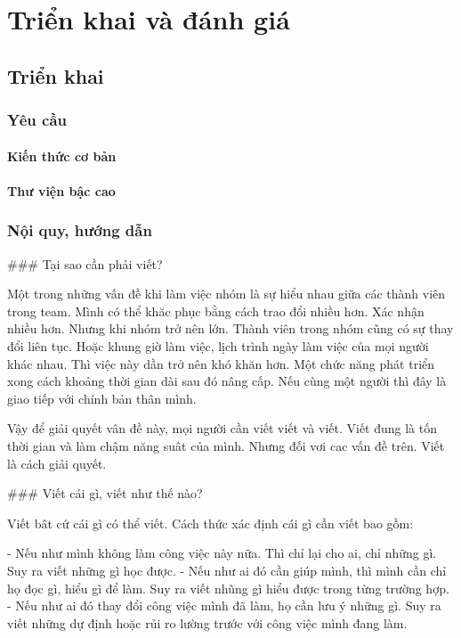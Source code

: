 
\chapter{Triển khai và đánh giá}
\section{Triển khai}
\subsection{Yêu cầu}
\subsubsection{Kiến thức cơ bản}
\subsubsection{Thư viện bậc cao}
\subsection{Nội quy, hướng dẫn}

\#\#\# Tại sao cần phải viết?

Một trong những vấn đề khi làm việc nhóm là sự hiểu nhau giữa các thành viên trong team.
Mình có thể khăc phục bằng cách trao đổi nhiều hơn. Xác nhận nhiều hơn. Nhưng khi nhóm trở nên lớn.
Thành viên trong nhóm cũng có sự thay đổi liên tục. Hoặc khung giờ làm việc, lịch trình ngày làm việc của mọi người khác nhau. Thì việc này dần trở nên khó khăn hơn. Một chức năng phát triển xong cách khoảng thời gian dài sau đó nâng cấp. Nếu cùng một người thì đây là giao tiếp với chính bản thân mình.

Vậy để giải quyết vân đề này, mọi người cần viết viết và viết. Viết đung là tốn thời gian và làm chậm năng suât của mình. Nhưng đối vơi cac vấn đề trên. Viết là cách giải quyết.

\#\#\# Viết cái gì, viết như thế nào?

Viết bât cứ cái gì có thể viết. Cách thức xác định cái gì cần viết bao gồm:

- Nếu như mình không làm công việc này nữa. Thì chỉ lại cho ai, chỉ những gì. Suy ra viết những gì học được.
- Nếu như ai đó cần giúp mình, thì mình cần chỉ họ đọc gì, hiểu gì để làm. Suy ra viết nhũng gì hiểu được trong từng trường hợp.
- Nếu như ai đó thay đổi công việc mình đã làm, họ cần lưu ý những gì. Suy ra viết những dự định hoặc rủi ro lường trước với công việc mình đang làm.



